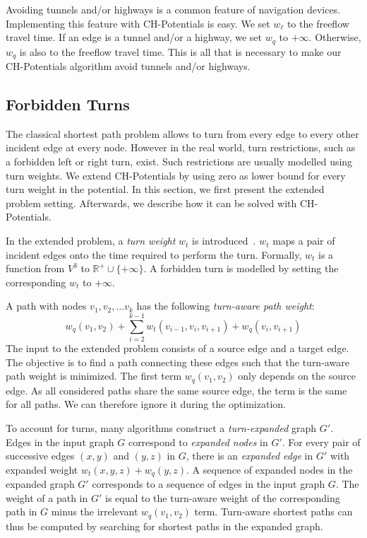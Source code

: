 \documentclass[letterpaper]{article} %
\begin{document}
Avoiding tunnels and/or highways is a common feature of navigation devices.
Implementing this feature with CH-Potentials is easy.
We set $w_\ell$ to the freeflow travel time. 
If an edge is a tunnel and/or a highway, we set $w_q$ to $+\infty$.
Otherwise, $w_q$ is also to the freeflow travel time.
This is all that is necessary to make our CH-Potentials algorithm avoid tunnels and/or highways.

\subsection{Forbidden Turns}
\label{sec:no-turns}

The classical shortest path problem allows to turn from every edge to every other incident edge at every node.
However in the real world, turn restrictions, such as a forbidden left or right turn, exist.
Such restrictions are usually modelled using turn weights.
We extend CH-Potentials by using zero as lower bound for every turn weight in the potential.
In this section, we first present the extended problem setting.
Afterwards, we describe how it can be solved with CH-Potentials.

In the extended problem, a \emph{turn weight} $w_t$ is introduced~\cite{related-turn-litrature,see-geisberger-turn-table-paper}.
$w_t$ maps a pair of incident edges onto the time required to perform the turn.
Formally, $w_t$ is a function from $V^3$ to $\mathbb{R}^+ \cup \{+\infty\}$.
A forbidden turn is modelled by setting the corresponding $w_t$ to $+\infty$.

A path with nodes $v_1, v_2,\ldots v_k$ has the following \emph{turn-aware path weight}:\[
w_q(v_1, v_2) + \sum_{i=2}^{k-1}  w_t(v_{i-1},v_i,v_{i+1})  + w_q(v_i,v_{i+1}) 
\] The input to the extended problem consists of a source edge and a target edge.
The objective is to find a path connecting these edges such that the turn-aware path weight is minimized.
The first term $w_q(v_1, v_2)$ only depends on the source edge.
As all considered paths share the same source edge, the term is the same for all paths.
We can therefore ignore it during the optimization.

To account for turns, many algorithms construct a \emph{turn-expanded} graph $G'$.
Edges in the input graph $G$ correspond to \emph{expanded nodes} in $G'$. 
For every pair of successive edges $(x,y)$ and $(y,z)$ in $G$, there is an \emph{expanded edge} in $G'$ with expanded weight $w_t(x,y,z) + w_q(y,z)$.
A sequence of expanded nodes in the expanded graph $G'$ corresponds to a sequence of edges in the input graph $G$.
The weight of a path in $G'$ is equal to the turn-aware weight of the corresponding path in $G$ minus the irrelevant $w_q(v_1,v_2)$ term.
Turn-aware shortest paths can thus be computed by searching for shortest paths in the expanded graph.
\end{document}
